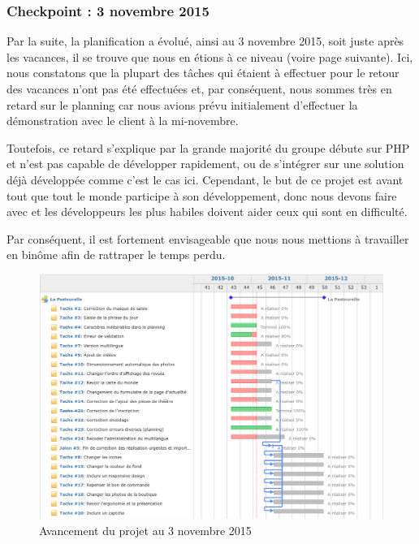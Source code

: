 \documentclass[11pt]{report}
\begin{document}
\subsubsection*{Checkpoint : 3 novembre 2015}
Par la suite, la planification a évolué, ainsi au 3 novembre 2015, soit juste
après les vacances, il se trouve que nous en étions à ce niveau (voire page
suivante). Ici, nous constatons que la plupart des tâches qui étaient à
effectuer pour le retour des vacances n'ont pas été effectuées et, par
conséquent, nous sommes très en retard sur le planning car nous avions prévu
initialement d'effectuer la démonstration avec le client à la mi-novembre.
\par Toutefois, ce retard s'explique par la grande majorité du groupe débute sur
PHP et n'est pas capable de développer rapidement, ou de s'intégrer sur une
solution déjà développée comme c'est le cas ici. Cependant, le but de ce projet
est avant tout que tout le monde participe à son développement, donc nous devons
faire avec et les développeurs les plus habiles doivent aider ceux qui sont en
difficulté. 
\par Par conséquent, il est fortement envisageable que nous nous mettions à
travailler en binôme afin de rattraper le temps perdu.

\begin{landscape}
\begin{figure}[t]
    \caption{Avancement du projet au 3 novembre 2015}
\includegraphics[scale=0.5]{include/gantt3-11.png}
\end{figure}
\end{landscape}
\end{document}
